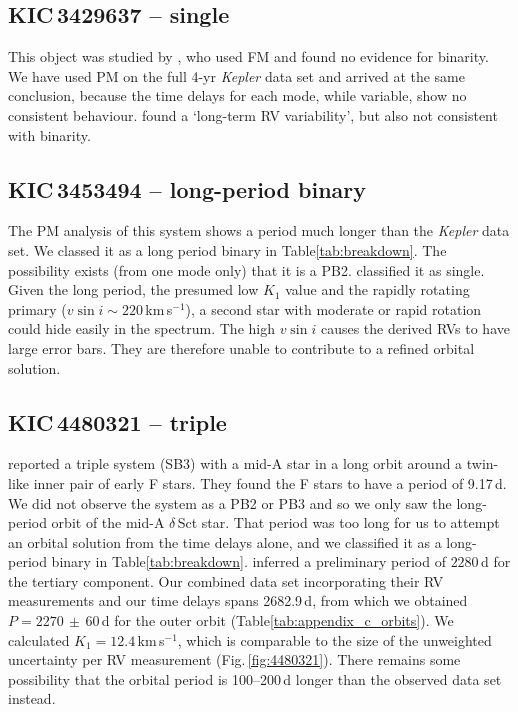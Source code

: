\documentclass[a4paper,fleqn,usenatbib]{mnras}
\begin{document}
\subsection{KIC\,3429637 -- single}
This object was studied by \citet{murphyetal2012}, who used FM and found no evidence for binarity. We have used PM on the full 4-yr \textit{Kepler} data set and arrived at the same conclusion, because the time delays for each mode, while variable, show no consistent behaviour. \citeauthor{lampensetal2017} found a `long-term RV variability', but also not consistent with binarity.


\subsection{KIC\,3453494 -- long-period binary}
The PM analysis of this system shows a period much longer than the \textit{Kepler} data set. We classed it as a long period binary in Table\:\ref{tab:breakdown}. The possibility exists (from one mode only) that it is a PB2. \citeauthor{lampensetal2017} classified it as single. Given the long period, the presumed low $K_1$ value and the rapidly rotating primary ($v\sin i \sim 220$\,km\,s$^{-1}$), a second star with moderate or rapid rotation could hide easily in the spectrum. The high $v\sin i$ causes the derived RVs to have large error bars. They are therefore unable to contribute to a refined orbital solution.


\subsection{KIC\,4480321 -- triple}
\citeauthor{lampensetal2017} reported a triple system (SB3) with a mid-A star in a long orbit around a twin-like inner pair of early F stars. They found the F stars to have a period of 9.17\,d. We did not observe the system as a PB2 or PB3 and so we only saw the long-period orbit of the mid-A $\delta$\,Sct star. That period was too long for us to attempt an orbital solution from the time delays alone, and we classified it as a long-period binary in Table\:\ref{tab:breakdown}. \citeauthor{lampensetal2017} inferred a preliminary period of $2280$\,d for the tertiary component. Our combined data set incorporating their RV measurements and our time delays spans 2682.9\,d, from which we obtained $P=2270\,\pm\,60$\,d for the outer orbit (Table\:\ref{tab:appendix_c_orbits}). We calculated $K_1 = 12.4$\,km\,s$^{-1}$, which is comparable to the size of the unweighted uncertainty per RV measurement (Fig.\,\ref{fig:4480321}). There remains some possibility that the orbital period is 100--200\,d longer than the observed data set instead.
\end{document}
